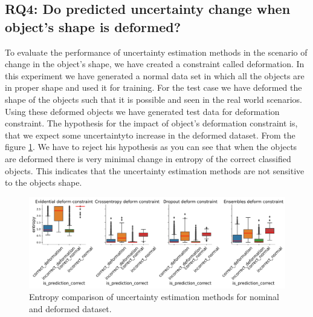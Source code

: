 \subsection{RQ4: Do predicted uncertainty change when object's shape is deformed? }

To evaluate the performance of uncertainty estimation methods in the scenario of change in the object's shape, we have created a constraint called deformation. In this experiment we have generated a normal data set  in which all the objects are in proper shape and used it for training. For the test case we have deformed the shape of the objects such that it is possible and seen in the real world scenarios. Using these deformed objects we have generated test data for deformation constraint. The hypothesis for the impact of object's deformation constraint is, that we expect some uncertaintyto increase in the deformed dataset. From the figure \ref{fig:entropy_deformation}.
We have to reject his hypothesis as you can see that when the objects are deformed there is very minimal change in entropy of the correct classified objects. This indicates that the uncertainty estimation methods are not sensitive to the objects shape.

\begin{figure}[t]
    \centering
    \includegraphics[width=\textwidth]{images/entropy_deformation_constraint.png}
    \caption{Entropy comparison of uncertainty estimation methods for nominal and deformed dataset.}
    \label{fig:entropy_deformation}
\end{figure}

